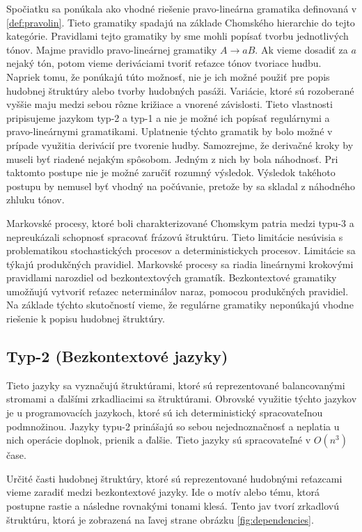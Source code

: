 Spočiatku sa ponúkala ako vhodné riešenie pravo-lineárna gramatika definovaná v \ref{def:pravolin}. Tieto gramatiky spadajú na základe Chomského hierarchie do tejto kategórie. Pravidlami tejto gramatiky by sme mohli popísať tvorbu jednotlivých tónov. Majme pravidlo pravo-lineárnej gramatiky $A \rightarrow aB$. Ak vieme dosadiť za $a$ nejaký tón, potom vieme deriváciami tvoriť reťazce tónov tvoriace hudbu. Napriek tomu, že ponúkajú túto možnosť, nie je ich možné použiť pre popis hudobnej štruktúry alebo tvorby hudobných pasáži. Variácie, ktoré sú rozoberané vyššie maju medzi sebou rôzne križiace a vnorené závislosti. Tieto vlastnosti pripisujeme jazykom typ-2 a typ-1 a nie je možné ich popísať regulárnymi a pravo-lineárnymi gramatikami. Uplatnenie týchto gramatik by bolo možné v prípade využitia derivácií pre tvorenie hudby. Samozrejme, že derivačné kroky by museli byť riadené nejakým spôsobom. Jedným z nich by bola náhodnosť. Pri taktomto postupe nie je možné zaručiť rozumný výsledok. Výsledok takéhoto postupu by nemusel byť vhodný na počúvanie, pretože by sa skladal z náhodného zhluku tónov.

Markovské procesy, ktoré boli charakterizované Chomskym patria medzi typu-3 a nepreukázali schopnosť spracovať frázovú štruktúru. Tieto limitácie nesúvisia s problematikou stochastických procesov a deterministickych procesov. Limitácie sa týkajú produkčných pravidiel. Markovské procesy sa riadia lineárnymi krokovými pravidlami narozdiel od bezkontextových gramatík. Bezkontextové gramatiky umožňujú vytvoriť reťazec neterminálov naraz, pomocou produkčných pravidiel. Na základe týchto skutočností vieme, že regulárne gramatiky neponúkajú vhodne riešenie k popisu hudobnej štruktúry.

\subsection*{Typ-2 (Bezkontextové jazyky)}
Tieto jazyky sa vyznačujú štruktúrami, ktoré sú reprezentované balancovanými stromami a ďalšími zrkadliacimi sa štruktúrami. Obrovské využitie týchto jazykov je u programovacích jazykoch, ktoré sú ich deterministický spracovateľnou podmnožinou. Jazyky typu-2 prinášajú so sebou nejednoznačnosť a neplatia u nich operácie doplnok, prienik a ďalšie. Tieto jazyky sú spracovateľné v $O(n^3)$ čase.

Určité časti hudobnej štruktúry, ktoré sú reprezentované hudobnými reťazcami vieme zaradiť medzi bezkontextové jazyky. Ide o motív alebo tému, ktorá postupne rastie a následne rovnakými tonami klesá. Tento jav tvorí zrkadlovú štruktúru, ktorá je zobrazená na ľavej strane obrázku \ref{fig:dependencies}.


